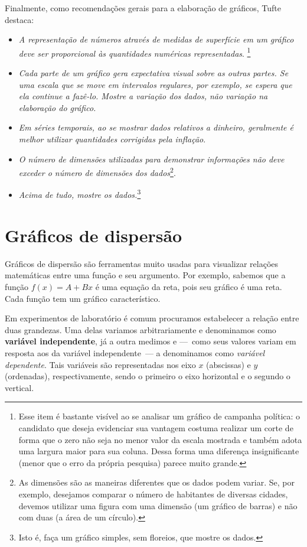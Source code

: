 Finalmente, como recomendações gerais para a elaboração de gráficos, Tufte destaca:
\begin{itemize}
	\item \emph{A representação de números através de medidas de superfície em um gráfico deve ser proporcional às quantidades numéricas representadas}. \footnote[][-3cm]{Esse item é bastante visível ao se analisar um gráfico de campanha política: o candidato que deseja evidenciar sua vantagem costuma realizar um corte de forma que o zero não seja no menor valor da escala mostrada e também adota uma largura maior para sua coluna. Dessa forma uma diferença insignificante (menor que o erro da própria pesquisa) parece muito grande.}
	\item \emph{Cada parte de um gráfico gera expectativa visual sobre as outras partes. Se uma escala que se move em intervalos regulares, por exemplo, se espera que ela continue a fazê-lo. Mostre a variação dos dados, não variação na elaboração do gráfico.}
	\item \emph{Em séries temporais, ao se mostrar dados relativos a dinheiro, geralmente é melhor utilizar quantidades corrigidas pela inflação}.
	\item \emph{O número de dimensões utilizadas para demonstrar informações não deve exceder o número de dimensões dos dados}\footnote{As dimensões são as maneiras diferentes que os dados podem variar. Se, por exemplo, desejamos comparar o número de habitantes de diversas cidades, devemos utilizar uma figura com uma dimensão (um gráfico de barras) e não com duas (a área de um círculo).}.
	\item \emph{Acima de tudo, mostre os dados.}\footnote{Isto é, faça um gráfico simples, sem floreios, que mostre os dados.}
\end{itemize}


\section{Gráficos de dispersão}

Gráficos de dispersão são ferramentas muito usadas para visualizar relações matemáticas entre uma função e seu argumento. Por exemplo, sabemos que a função $f(x) = A + Bx$ é uma equação da reta, pois seu gráfico é uma reta. Cada função tem um gráfico característico. 

Em experimentos de laboratório é comum procuramos estabelecer a relação entre duas grandezas. Uma delas variamos arbitrariamente e denominamos como \textbf{variável independente}, já a outra medimos e ---~como seus valores variam em resposta aos da variável independente~--- a denominamos como \emph{variável dependente}. Tais variáveis são representadas nos eixo $x$  (abscissas) e $y$ (ordenadas), respectivamente, sendo o primeiro o eixo horizontal e o segundo o vertical. 

